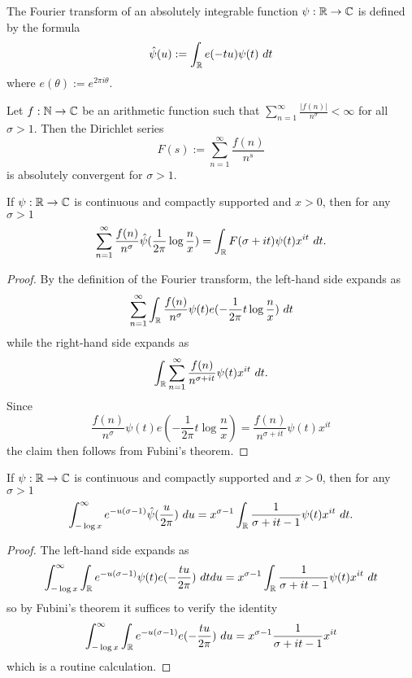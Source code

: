 
The Fourier transform of an absolutely integrable function $\psi: \R \to \C$ is defined by the formula
$$ \hat \psi(u) := \int_\R e(-tu) \psi(t)\ dt$$
where $e(\theta) := e^{2\pi i \theta}$.

Let $f: \N \to \C$ be an arithmetic function such that $\sum_{n=1}^\infty \frac{|f(n)|}{n^\sigma} < \infty$ for all $\sigma>1$.  Then the Dirichlet series
$$ F(s) := \sum_{n=1}^\infty \frac{f(n)}{n^s}$$
is absolutely convergent for $\sigma>1$.



\begin{lemma}\label{first-fourier}  If $\psi: \R \to \C$ is continuous and compactly supported and $x > 0$, then for any $\sigma>1$
  $$ \sum_{n=1}^\infty \frac{f(n)}{n^\sigma} \hat \psi( \frac{1}{2\pi} \log \frac{n}{x} ) = \int_\R F(\sigma + it) \psi(t) x^{it}\ dt.$$
\end{lemma}



\begin{proof}  By the definition of the Fourier transform, the left-hand side expands as
$$ \sum_{n=1}^\infty \int_\R \frac{f(n)}{n^\sigma} \psi(t) e( - \frac{1}{2\pi} t \log \frac{n}{x})\ dt$$
while the right-hand side expands as
$$ \int_\R \sum_{n=1}^\infty \frac{f(n)}{n^{\sigma+it}} \psi(t) x^{it}\ dt.$$
Since
$$\frac{f(n)}{n^\sigma} \psi(t) e( - \frac{1}{2\pi} t \log \frac{n}{x}) = \frac{f(n)}{n^{\sigma+it}} \psi(t) x^{it}$$
the claim then follows from Fubini's theorem.
\end{proof}



\begin{lemma}\label{second-fourier} If $\psi: \R \to \C$ is continuous and compactly supported and $x > 0$, then for any $\sigma>1$
$$ \int_{-\log x}^\infty e^{-u(\sigma-1)} \hat \psi(\frac{u}{2\pi})\ du = x^{\sigma - 1} \int_\R \frac{1}{\sigma+it-1} \psi(t) x^{it}\ dt.$$
\end{lemma}



\begin{proof}
  The left-hand side expands as
  $$ \int_{-\log x}^\infty \int_\R e^{-u(\sigma-1)} \psi(t) e(-\frac{tu}{2\pi})\ dt du = x^{\sigma - 1} \int_\R \frac{1}{\sigma+it-1} \psi(t) x^{it}\ dt$$
  so by Fubini's theorem it suffices to verify the identity
$$ \int_{-\log x}^\infty \int_\R e^{-u(\sigma-1)} e(-\frac{tu}{2\pi})\ du = x^{\sigma - 1} \frac{1}{\sigma+it-1} x^{it}$$
which is a routine calculation.
\end{proof}




